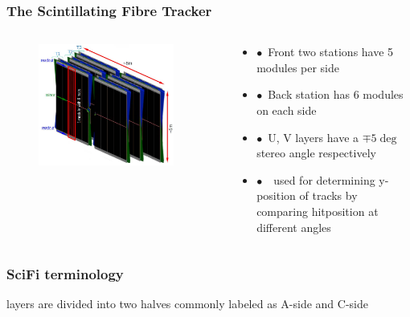 \documentclass[aspectratio=1610, 12pt, xcolor=dvipsnames]{beamer}
\begin{document}
\begin{frame}\frametitle{The Scintillating Fibre Tracker}
  \begin{columns}
    \begin{column}[c]{0.48\textwidth}
      \begin{figure}
        \includegraphics[width=0.9\textwidth]{logos/scifi.png}
      \end{figure}
    \end{column}
    \begin{column}{0.48\textwidth}
      \begin{itemize}
        \item $\bullet$\, Front two stations have 5 modules per side
        \item $\bullet$\, Back station has 6 modules on each side
        \item $\bullet$\, U, V layers have a $\mp 5 \deg$ stereo angle respectively
        \item $\bullet$\, \to\, used for determining y-position of tracks by comparing hitposition at different angles
      \end{itemize}
    \end{column}
  \end{columns}
\end{frame}

\begin{frame}\frametitle{SciFi terminology}
  layers are divided into two halves commonly labeled as A-side and C-side
  
\end{frame}
\end{document}
